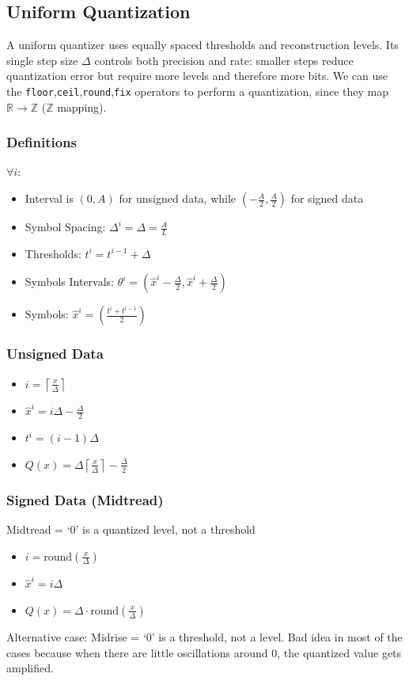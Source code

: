 \subsection{Uniform Quantization}
A uniform quantizer uses equally spaced thresholds and reconstruction levels. Its single step size $\Delta$ controls both precision and rate: smaller steps reduce quantization error but require more levels and therefore more bits.
We can use the \verb|floor|,\verb|ceil|,\verb|round|,\verb|fix| operators to perform a quantization, since they map $\mathbb{R} \to \mathbb{Z}$ ($\mathbb{Z}$ mapping).
\subsubsection{Definitions}
$\forall i$:
\begin{itemize}
    \item Interval is $(0,A)$ for unsigned data, while $(-\frac{A}{2},\frac{A}{2})$ for signed data
    \item Symbol Spacing: $\Delta^i = \Delta = \frac{A}{L}$
    \item Thresholds: $t^{i} = t^{i-1} + \Delta$
    \item Symbols Intervals: $\theta^i = \left(\hat{x}^i-\frac{\Delta}{2},\hat{x}^i+\frac{\Delta}{2}\right)$
    \item Symbols: $\hat{x}^i = \left(\frac{t^i + t^{i-1}}{2}\right)$
\end{itemize}
\subsubsection{Unsigned Data}
\begin{itemize}
    \item $ i =\left\lceil\frac{x}{\Delta}\right\rceil$
    \item $\hat{x}^i = i\Delta - \frac{\Delta}{2}$
    \item $t^i = (i-1)\Delta$
    \item $Q(x) = \Delta \left\lceil\frac{x}{\Delta}\right\rceil -\frac{\Delta}{2}$
\end{itemize}
\subsubsection{Signed Data (Midtread)}
Midtread = `0' is a quantized level, not a threshold
\begin{itemize}
    \item $ i =\text{round}\left(\frac{x}{\Delta}\right)$
    \item $\hat{x}^i = i\Delta$
    \item $Q(x) = \Delta \cdot\text{round}\left(\frac{x}{\Delta}\right)$
\end{itemize}
Alternative case: Midrise = `0' is a threshold, not a level. Bad idea in most of the cases because when there are little oscillations around 0, the quantized value gets amplified.
